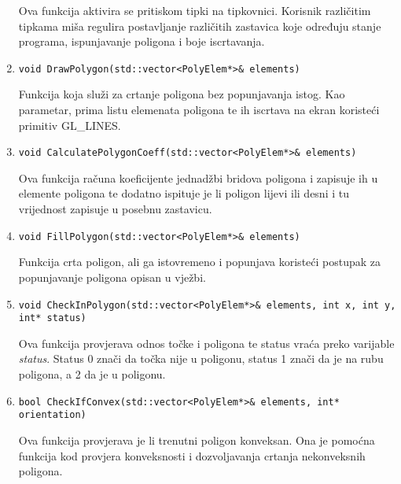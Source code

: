 \documentclass[utf8]{fer}
\begin{document}
\begin{enumerate}
Ova funkcija aktivira se pritiskom tipki na tipkovnici. Korisnik različitim tipkama miša regulira postavljanje različitih zastavica koje određuju stanje programa, ispunjavanje poligona i boje iscrtavanja.

\item \begin{lstlisting}
void DrawPolygon(std::vector<PolyElem*>& elements)
\end{lstlisting}

Funkcija koja služi za crtanje poligona bez popunjavanja istog. Kao parametar, prima listu elemenata poligona te ih iscrtava na ekran koristeći primitiv GL\_LINES.

\item \begin{lstlisting}
void CalculatePolygonCoeff(std::vector<PolyElem*>& elements)
\end{lstlisting}

Ova funkcija računa koeficijente jednadžbi bridova poligona i zapisuje ih u elemente poligona te dodatno ispituje je li poligon lijevi ili desni i tu vrijednost zapisuje u posebnu zastavicu.

\item \begin{lstlisting}
void FillPolygon(std::vector<PolyElem*>& elements)
\end{lstlisting}

Funkcija crta poligon, ali ga istovremeno i popunjava koristeći postupak za popunjavanje poligona opisan u vježbi.

\item \begin{lstlisting}
void CheckInPolygon(std::vector<PolyElem*>& elements, int x, int y, int* status)
\end{lstlisting}

Ova funkcija provjerava odnos točke i poligona te status vraća preko varijable \textit{status}. Status 0 znači da točka nije u poligonu, status 1 znači da je na rubu poligona, a 2 da je u poligonu.

\item \begin{lstlisting}
bool CheckIfConvex(std::vector<PolyElem*>& elements, int* orientation)
\end{lstlisting}

Ova funkcija provjerava je li trenutni poligon konveksan. Ona je pomoćna funkcija kod provjera konveksnosti i dozvoljavanja crtanja nekonveksnih poligona.

\end{enumerate}
\end{document}

